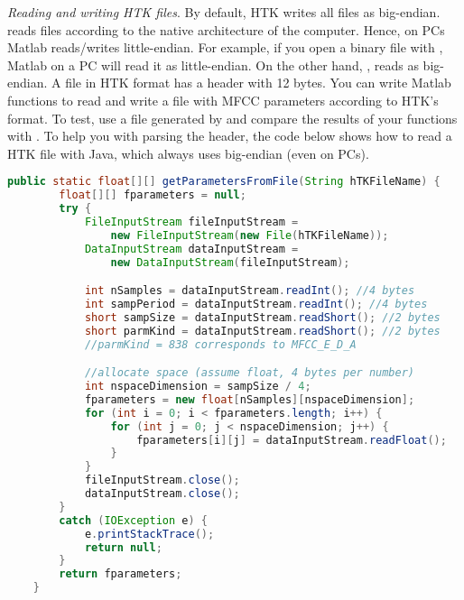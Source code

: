 \emph{Reading and writing HTK files}. By default, HTK writes all
files as big-endian. {\matlab} reads files according to the native
architecture of the computer. Hence, on PCs Matlab reads/writes
little-endian. For example, if you open a binary file with , Matlab on a PC will read it as
little-endian. On the other hand, , reads as big-endian. A file in
HTK format has a header with 12 bytes. You can write Matlab functions to
read and write a file with MFCC parameters according to HTK's
format. To test, use a file generated by  and compare
the results of your functions with . To help you with
parsing the header, the code below shows how to read a HTK file
with Java, which always uses big-endian (even on PCs).
\begin{lstlisting}[language=java]
    public static float[][] getParametersFromFile(String hTKFileName) {
        float[][] fparameters = null;
        try {
            FileInputStream fileInputStream =
                new FileInputStream(new File(hTKFileName));
            DataInputStream dataInputStream =
                new DataInputStream(fileInputStream);

            int nSamples = dataInputStream.readInt(); //4 bytes
            int sampPeriod = dataInputStream.readInt(); //4 bytes
            short sampSize = dataInputStream.readShort(); //2 bytes
            short parmKind = dataInputStream.readShort(); //2 bytes
            //parmKind = 838 corresponds to MFCC_E_D_A

            //allocate space (assume float, 4 bytes per number)
            int nspaceDimension = sampSize / 4;
            fparameters = new float[nSamples][nspaceDimension];
            for (int i = 0; i < fparameters.length; i++) {
                for (int j = 0; j < nspaceDimension; j++) {
                    fparameters[i][j] = dataInputStream.readFloat();
                }
            }
            fileInputStream.close();
            dataInputStream.close();
        }
        catch (IOException e) {
            e.printStackTrace();
            return null;
        }
        return fparameters;
    }
\end{lstlisting}
